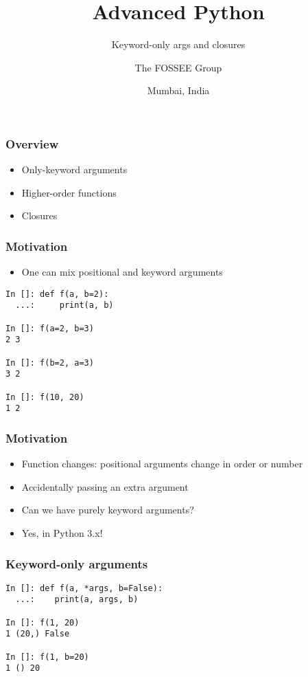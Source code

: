 \documentclass[14pt,compress]{beamer}
\title[only kwargs]{Advanced Python}
\subtitle{Keyword-only args and closures}
\author[FOSSEE] {The FOSSEE Group}
\institute[IIT Bombay] {Department of Aerospace Engineering\\IIT Bombay}
\date[] {Mumbai, India}
\begin{document}
\begin{frame}
  \titlepage
\end{frame}

\begin{frame}
  \frametitle{Overview}
  \begin{itemize}
  \item Only-keyword arguments
  \item Higher-order functions
  \item Closures
  \end{itemize}
\end{frame}

\begin{frame}[fragile]
  \frametitle{Motivation}
  \begin{itemize}
  \item One can mix positional and keyword arguments
  \end{itemize}
  \begin{lstlisting}
In []: def f(a, b=2):
  ...:     print(a, b)

In []: f(a=2, b=3)
2 3

In []: f(b=2, a=3)
3 2

In []: f(10, 20)
1 2
\end{lstlisting}
\end{frame}

\begin{frame}[fragile]
  \frametitle{Motivation}
  \begin{itemize}
  \item Function changes: positional arguments change in order or number
  \item Accidentally passing an extra argument
  \item Can we have purely keyword arguments?

    \vspace*{0.5in}
  \item Yes, in Python 3.x!
  \end{itemize}
\end{frame}

\begin{frame}[fragile]
  \frametitle{Keyword-only arguments}
  \begin{lstlisting}
In []: def f(a, *args, b=False):
  ...:    print(a, args, b)

In []: f(1, 20)
1 (20,) False

In []: f(1, b=20)
1 () 20
\end{lstlisting}
\end{frame}
\end{document}

